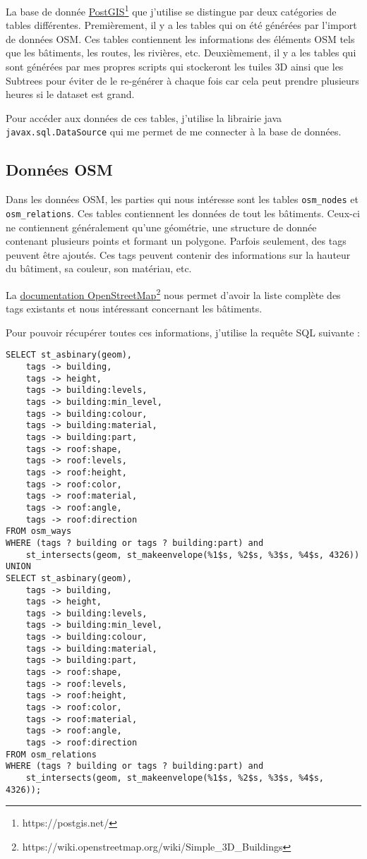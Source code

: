 La base de donnée \href{https://postgis.net/}{PostGIS}\footnote{https://postgis.net/} que j'utilise se distingue par deux catégories de tables différentes. Premièrement, il y a les tables qui on été générées par l'import de données OSM. Ces tables contiennent les informations des éléments OSM tels que les bâtiments, les routes, les rivières, etc. Deuxièmement, il y a les tables qui sont générées par mes propres scripts qui stockeront les tuiles 3D ainsi que les Subtrees pour éviter de le re-générer à chaque fois car cela peut prendre plusieurs heures si le dataset est grand.

Pour accéder aux données de ces tables, j'utilise la librairie java \texttt{javax.sql.DataSource} qui me permet de me connecter à la base de données.

\subsection{Données OSM}

Dans les données OSM, les parties qui nous intéresse sont les tables \texttt{osm\_nodes} et \texttt{osm\_relations}. Ces tables contiennent les données de tout les bâtiments. Ceux-ci ne contiennent généralement qu'une \Gls{géométrie}, une structure de donnée contenant plusieurs points et formant un polygone. Parfois seulement, des \Gls{tags} peuvent être ajoutés. Ces tags peuvent contenir des informations sur la hauteur du bâtiment, sa couleur, son matériau, etc.

La \href{https://wiki.openstreetmap.org/wiki/Simple_3D_Buildings}{documentation OpenStreetMap}\footnote{https://wiki.openstreetmap.org/wiki/Simple\_3D\_Buildings} nous permet d'avoir la liste complète des tags existants et nous intéressant concernant les bâtiments.

Pour pouvoir récupérer toutes ces informations, j'utilise la requête SQL suivante :

\begin{verbatim}
SELECT st_asbinary(geom),
    tags -> building,
    tags -> height,
    tags -> building:levels,
    tags -> building:min_level,
    tags -> building:colour,
    tags -> building:material,
    tags -> building:part,
    tags -> roof:shape,
    tags -> roof:levels,
    tags -> roof:height,
    tags -> roof:color,
    tags -> roof:material,
    tags -> roof:angle,
    tags -> roof:direction
FROM osm_ways
WHERE (tags ? building or tags ? building:part) and
    st_intersects(geom, st_makeenvelope(%1$s, %2$s, %3$s, %4$s, 4326))
UNION
SELECT st_asbinary(geom),
    tags -> building,
    tags -> height,
    tags -> building:levels,
    tags -> building:min_level,
    tags -> building:colour,
    tags -> building:material,
    tags -> building:part,
    tags -> roof:shape,
    tags -> roof:levels,
    tags -> roof:height,
    tags -> roof:color,
    tags -> roof:material,
    tags -> roof:angle,
    tags -> roof:direction
FROM osm_relations
WHERE (tags ? building or tags ? building:part) and
    st_intersects(geom, st_makeenvelope(%1$s, %2$s, %3$s, %4$s, 4326));
\end{verbatim}

